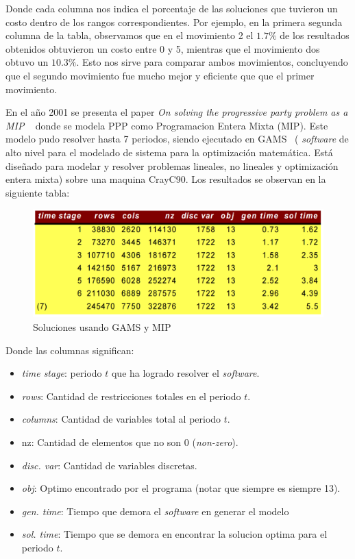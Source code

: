 \documentclass[letter, 10pt]{article}
\begin{document}
Donde cada columna nos indica el porcentaje de las soluciones que tuvieron un costo dentro de los rangos correspondientes. Por ejemplo, en la primera segunda columna de la tabla, observamos que en el movimiento 2 el $1.7\%$ de los resultados obtenidos obtuvieron un costo entre 0 y 5, mientras que el movimiento dos obtuvo un $10.3\%$. Esto nos sirve para comparar ambos movimientos, concluyendo que el segundo movimiento fue mucho mejor y eficiente que que el primer movimiento.

En el año 2001 se presenta el paper \textit{On solving the progressive party problem as a MIP} ~\cite{Kalvelagen20031713} donde se modela PPP como Programacion Entera Mixta (MIP). Este modelo pudo resolver hasta 7 periodos, siendo ejecutado en GAMS~\cite{Brook:1988:GUG:58859.58863} ( \textit{software} de alto nivel para el modelado de sistema para la optimización matemática. Está diseñado para modelar y resolver problemas lineales, no lineales y optimización entera mixta) sobre una maquina CrayC90. Los resultados se observan en la siguiente tabla:

\begin{figure}[ht!]
\centering
 \includegraphics[width=1.0\textwidth]{party6.png}
 \caption{Soluciones usando GAMS y MIP}
\end{figure}

\newpage
Donde las columnas significan:
\begin{itemize}
    \item \textit{time stage}: periodo $t$ que ha logrado resolver el \textit{software}.
    \item \textit{rows}: Cantidad de restricciones totales en el periodo $t$.
    \item \textit{columns}: Cantidad de variables total al periodo $t$.
    \item nz: Cantidad de elementos que no son 0 (\textit{non-zero}).
    \item \textit{disc. var}: Cantidad de variables discretas.
    \item \textit{obj}: Optimo encontrado por el programa (notar que siempre es siempre 13).
    \item \textit{gen. time}: Tiempo que demora el \textit{software} en generar el modelo
    \item \textit{sol. time}: Tiempo que se demora en encontrar la solucion optima para el periodo $t$.
\end{itemize}
\end{document}
